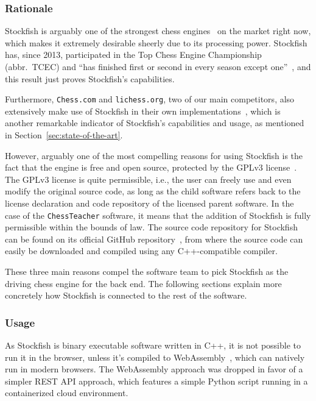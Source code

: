 \subsubsection{Rationale}

Stockfish is arguably one of the strongest chess engines~\cite{about-stockfish} on the market right now,
which makes it extremely desirable sheerly due to its processing power.
Stockfish has, since 2013, participated in the Top Chess Engine Championship (abbr.\ TCEC) and ``has finished first or
second in every season except one''~\cite{tcec-results,chess-com-stockfish},
and this result just proves Stockfish's capabilities.

Furthermore, \texttt{Chess.com} and \texttt{lichess.org}, two of our main competitors, also extensively make use of
Stockfish in their own implementations~\cite{chess-com-stockfish,about-lichess}, which is another remarkable indicator
of Stockfish's capabilities and usage, as mentioned in Section~\ref{sec:state-of-the-art}.

However, arguably one of the most compelling reasons for using Stockfish is the fact that the engine is free and open
source, protected by the GPLv3 license~\cite{gplv3}.
The GPLv3 license is quite permissible, i.e., the user can freely use and even modify the original source code, as long
as the child software refers back to the license declaration and code repository of the licensed parent software.
In the case of the \texttt{ChessTeacher} software, it means that the addition of Stockfish is fully permissible within
the bounds of law.
The source code repository for Stockfish can be found on its official GitHub repository~\cite{github-stockfish}, from
where the source code can easily be downloaded and compiled using any C++-compatible compiler.

These three main reasons compel the software team to pick Stockfish as the driving chess engine for the back end.
The following sections explain more concretely how Stockfish is connected to the rest of the software.

\subsubsection{Usage}

As Stockfish is binary executable software written in C++, it is not possible to run it in the browser,
unless it's compiled to WebAssembly~\cite{web-assembly}, which can natively run in modern browsers.
The WebAssembly approach was dropped in favor of a simpler REST API approach,
which features a simple Python script running in a containerized cloud environment.

